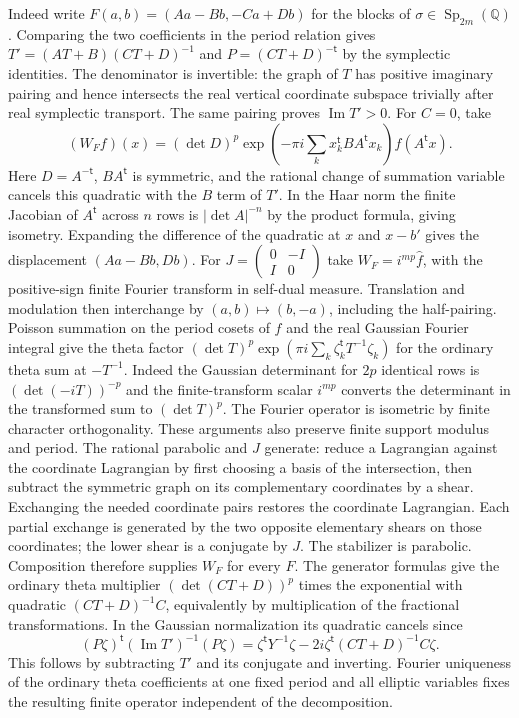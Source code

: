 Indeed write $F(a,b)=(Aa-Bb,-Ca+Db)$ for the blocks of
$\sigma\in\operatorname{Sp}_{2m}(\mathbb Q)$. Comparing the two
coefficients in the period relation gives
$T'=(AT+B)(CT+D)^{-1}$ and $P=(CT+D)^{-\mathsf t}$ by the
symplectic identities. The denominator is invertible: the graph
of $T$ has positive imaginary pairing and hence intersects the real
vertical coordinate subspace trivially after real symplectic
transport. The same pairing proves $\operatorname{Im}T'>0$.
For $C=0$, take
\[
 (W_F f)(x)=(\det D)^p
 \exp\!\left(-\pi i\sum_k x_k^{\mathsf t}BA^{\mathsf t}x_k\right)
 f(A^{\mathsf t}x).
\]
Here $D=A^{-\mathsf t}$, $BA^{\mathsf t}$ is symmetric, and
the rational change of summation variable cancels this quadratic
with the $B$ term of $T'$. In the Haar norm the finite Jacobian
of $A^{\mathsf t}$ across $n$ rows is $|\det A|^{-n}$ by the
product formula, giving isometry. Expanding the difference of the
quadratic at $x$ and $x-b'$ gives the displacement
$(Aa-Bb,Db)$. For $J=\left(\begin{smallmatrix}0&-I\\ I&0
\end{smallmatrix}\right)$ take $W_F=i^{mp}\widehat f$, with
the positive-sign finite Fourier transform in self-dual measure.
Translation and modulation then interchange by
$(a,b)\mapsto(b,-a)$, including the half-pairing. Poisson summation
on the period cosets of $f$ and the real Gaussian Fourier integral
give the theta factor $(\det T)^p\exp(\pi i\sum_k
\zeta_k^{\mathsf t}T^{-1}\zeta_k)$ for the ordinary theta sum at
$-T^{-1}$. Indeed the Gaussian determinant for $2p$ identical
rows is $(\det(-iT))^{-p}$ and the finite-transform scalar
$i^{mp}$ converts the determinant in the transformed sum to
$(\det T)^p$. The Fourier operator is isometric by finite character
orthogonality. These arguments also preserve finite support modulus
and period. The rational parabolic and $J$ generate: reduce a
Lagrangian against the coordinate Lagrangian by first choosing
a basis of the intersection, then subtract the symmetric graph
on its complementary coordinates by a shear. Exchanging the needed
coordinate pairs restores the coordinate Lagrangian. Each partial
exchange is generated by the two opposite elementary shears
on those coordinates; the lower shear is a conjugate by $J$.
The stabilizer is parabolic. Composition therefore supplies $W_F$
for every $F$. The generator formulas give the ordinary theta
multiplier $(\det(CT+D))^p$ times the exponential with quadratic
$(CT+D)^{-1}C$, equivalently by multiplication of the fractional
transformations. In the Gaussian normalization its quadratic
cancels since
\[
 (P\zeta)^{\mathsf t}(\operatorname{Im}T')^{-1}(P\zeta)
 =\zeta^{\mathsf t}Y^{-1}\zeta
   -2i\zeta^{\mathsf t}(CT+D)^{-1}C\zeta .
\]
This follows by subtracting $T'$ and its conjugate and inverting.
Fourier uniqueness of the ordinary theta coefficients at one fixed
period and all elliptic variables fixes the resulting finite
operator independent of the decomposition.

